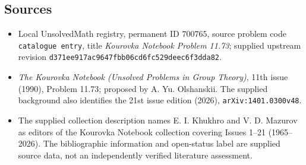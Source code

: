 \documentclass[11pt]{article}
\begin{document}
\subsection{Sources}
\begin{itemize}
\item Local UnsolvedMath registry, permanent ID \(700765\), source problem code \texttt{catalogue entry}, title \emph{Kourovka Notebook Problem 11.73}; supplied upstream revision \texttt{d371ee917ac9647fbb06cd6fc529deec6f3dda82}.
\item \emph{The Kourovka Notebook (Unsolved Problems in Group Theory)}, 11th issue (1990), Problem 11.73; proposed by A. Yu. Olshanskii. The supplied background also identifies the 21st issue edition (2026), \texttt{arXiv:1401.0300v48}.
\item The supplied collection description names E. I. Khukhro and V. D. Mazurov as editors of the Kourovka Notebook collection covering Issues 1--21 (1965--2026). The bibliographic information and open-status label are supplied source data, not an independently verified literature assessment.
\end{itemize}
\end{document}
